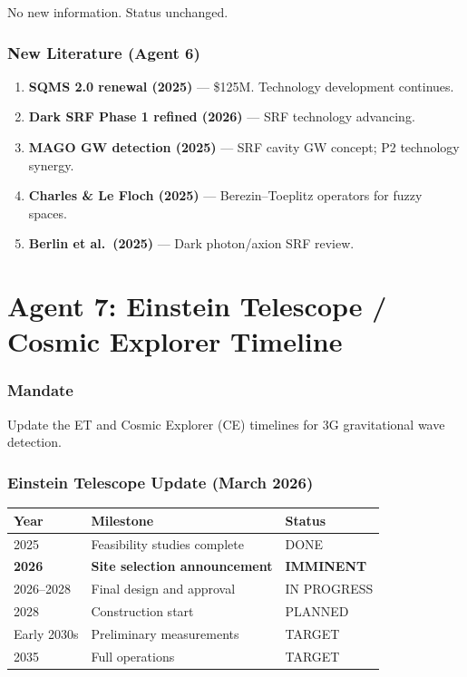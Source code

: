 \documentclass[11pt,a4paper]{article}
\begin{document}
No new information. Status unchanged.

\section{New Literature (Agent 6)}

\begin{enumerate}
\item \textbf{SQMS 2.0 renewal (2025)} --- \$125M. Technology development continues.
\item \textbf{Dark SRF Phase 1 refined (2026)} --- SRF technology advancing.
\item \textbf{MAGO GW detection (2025)} --- SRF cavity GW concept; P2 technology synergy.
\item \textbf{Charles \& Le Floch (2025)} --- Berezin--Toeplitz operators for fuzzy spaces.
\item \textbf{Berlin et al.\ (2025)} --- Dark photon/axion SRF review.
\end{enumerate}


\part{Agent 7: Einstein Telescope / Cosmic Explorer Timeline}
\label{part:agent7}

\section{Mandate}

Update the ET and Cosmic Explorer (CE) timelines for 3G gravitational wave detection.

\section{Einstein Telescope Update (March 2026)}

\begin{center}
\begin{tabular}{lll}
\toprule
\textbf{Year} & \textbf{Milestone} & \textbf{Status} \\
\midrule
2025 & Feasibility studies complete & DONE \\
\textbf{2026} & \textbf{Site selection announcement} & \textbf{IMMINENT} \\
2026--2028 & Final design and approval & IN PROGRESS \\
2028 & Construction start & PLANNED \\
Early 2030s & Preliminary measurements & TARGET \\
2035 & Full operations & TARGET \\
\bottomrule
\end{tabular}
\end{center}
\end{document}
